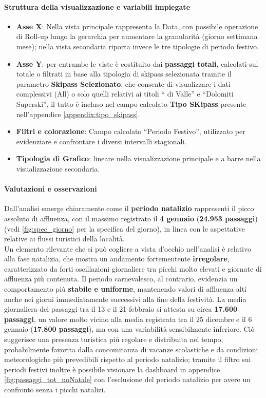 \paragraph{Struttura della visualizzazione e variabili impiegate}
\begin{itemize}
    \item \textbf{Asse X}: Nella vista principale rappresenta la Data, con possibile operazione di Roll-up lungo la gerarchia per aumentare la granularità (giorno \textrightarrow  settimana \textrightarrow  mese); nella vista secondaria riporta invece le tre tipologie di periodo festivo.
    \item \textbf{Asse Y}:  per entrambe le viste è costituito dai \textbf{passaggi totali}, calcolati sul totale o filtrati in base alla tipologia di skipass selezionata tramite il parametro \textbf{Skipass Selezionato}, che consente di visualizzare i dati complessivi (All) o solo quelli relativi ai titoli  “ di Valle” e “Dolomiti Superski”, il tutto è incluso nel campo calcolato \textbf{Tipo SKipass} presente nell'appendice \ref{appendix:tipo_skipass}.
    \item \textbf{Filtri e colorazione}: Campo calcolato “Periodo Festivo”, utilizzato per evidenziare e confrontare i diversi intervalli stagionali.
    \item \textbf{Tipologia di Grafico}: lineare nella visualizzazione principale e a barre nella visualizzazione secondaria.
\end{itemize}

\paragraph{Valutazioni e osservazioni}
Dall’analisi emerge chiaramente come il \textbf{periodo natalizio} rappresenti il picco assoluto di affluenza, con il massimo registrato il \textbf{4 gennaio} (\textbf{24.953 passaggi}) (vedi \ref{fig:spec_giorno} per la specifica del giorno), in linea con le aspettative relative ai flussi turistici della località. \\

Un elemento rilevante che si può cogliere a vista d'occhio nell'analisi è relativo alla fase natalizia, che mostra un andamento fortementente \textbf{irregolare}, caratterizzato da forti oscillazioni giornaliere tra picchi molto elevati e giornate di affluenza più contenuta.
Il periodo carnevalesco, al contrario, evidenzia un comportamento più \textbf{stabile e uniforme}, mantenendo valori di affluenza alti anche nei giorni immediatamente successivi alla fine della festività.  
La media giornaliera dei passaggi tra il 13 e il 21 febbraio si attesta su circa \textbf{17.600 passaggi}, un valore molto vicino alla media registrata tra il 25 dicembre e il 6 gennaio (\textbf{17.800 passaggi}), ma con una variabilità sensibilmente inferiore.  
Ciò suggerisce una presenza turistica più regolare e distribuita nel tempo, probabilmente favorita dalla concomitanza di vacanze scolastiche e da condizioni meteorologiche più prevedibili rispetto al periodo natalizio; tramite il filtro sui periodi festivi inoltre è possibile visionare la dashboard in appendice \ref{fig:passaggi_tot_noNatale} con l'esclusione del periodo natalizio per avere un  confronto senza i picchi natalizi.

